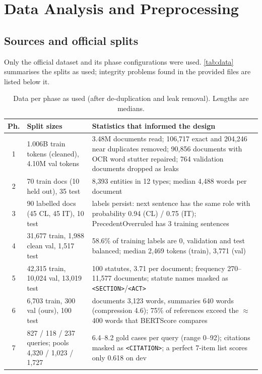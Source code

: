 \documentclass[11pt, oneside]{article}
\newcommand{\code}[1]{\texttt{\small #1}}
\begin{document}
\section{Data Analysis and Preprocessing}
\subsection{Sources and official splits}
Only the official dataset and its phase configurations were used.  \autoref{tab:data} summarises the splits
as used; integrity problems found in the provided files are listed below it.

\begin{table}[!t]\centering\footnotesize
\caption{Data per phase as used (after de-duplication and leak removal).  Lengths are medians.}\label{tab:data}
\scriptsize\begin{tabularx}{\linewidth}{clX}\toprule
Ph. & Split sizes & Statistics that informed the design\\\midrule
1 & 1.006B train tokens (cleaned), 4.10M val tokens & 3.48M documents read; 106,717 exact and 204,246 near
duplicates removed; 90,856 documents with OCR word stutter repaired; 764 validation documents dropped as leaks\\
2 & 70 train docs (10 held out), 35 test & 8,393 entities in 12 types; median 4,488 words per document\\
3 & 90 labelled docs (45 CL, 45 IT), 10 test & labels persist: next sentence has the same role with
probability 0.94 (CL) / 0.75 (IT); PrecedentOverruled has 3 training sentences\\
4 & 31,677 train, 1,988 clean val, 1,517 test & 58.6\% of training labels are 0, validation and test balanced;
median 2,469 tokens (train), 3,771 (val)\\
5 & 42,315 train, 10,024 val, 13,019 test & 100 statutes, 3.71 per document; frequency 270--11,577 documents;
statute names masked as \code{<SECTION>}/\code{<ACT>}\\
6 & 6,703 train, 300 val (ours), 100 test & documents 3,123 words, summaries 640 words (compression 4.6);
75\% of references exceed the $\approx$400 words that BERTScore compares\\
7 & 827 / 118 / 237 queries; pools 4,320 / 1,023 / 1,727 & 6.4--8.2 gold cases per query (range 0--92);
citations masked as \code{<CITATION>}; a perfect 7-item list scores only 0.618 on dev\\
\bottomrule\end{tabularx}\end{table}
\end{document}

